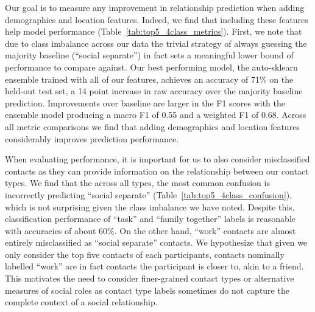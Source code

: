 \documentclass[acmlarge]{acmart}
\begin{document}
Our goal is to measure any improvement in relationship prediction when adding demographics and location features. Indeed, we find that including these features help model performance (Table~\ref{tab:top5_4class_metrics}). First, we note that due to class imbalance across our data the trivial strategy of always guessing the majority baseline (``social separate'') in fact sets a meaningful lower bound of performance to compare against. Our best performing model, the auto-sklearn ensemble trained with all of our features, achieves an accuracy of 71\% on the held-out test set, a 14 point increase in raw accuracy over the majority baseline prediction. Improvements over baseline are larger in the F1 scores with the ensemble model producing a macro F1 of 0.55 and a weighted F1 of 0.68. Across all metric comparisons we find that adding demographics and location features considerably improves prediction performance.


When evaluating performance, it is important for us to also consider misclassified contacts as they can provide information on the relationship between our contact types. We find that the across all types, the most common confusion is incorrectly predicting ``social separate'' (Table~\ref{tab:top5_4class_confusion}), which is not surprising given the class imbalance we have noted. Despite this, classification performance of ``task'' and ``family together'' labels is reasonable with accuracies of about 60\%. On the other hand, ``work'' contacts are almost entirely misclassified as ``social separate'' contacts. We hypothesize that given we only consider the top five contacts of each participants, contacts nominally labelled ``work'' are in fact contacts the participant is closer to, akin to a friend. This motivates the need to consider finer-grained contact types or alternative measures of social roles as contact type labels sometimes do not capture the complete context of a social relationship.
\end{document}
